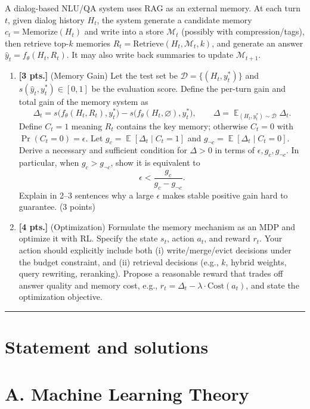 \documentclass[11pt,a4paper]{article}
\DeclareMathOperator{\E}{\mathbb{E}}
\newcommand{\examstatement}[1]{%
  \par\addvspace{0.85em}%
  \noindent{\bfseries #1}\par\nobreak\addvspace{0.28em}%
}
\begin{document}
\examstatement{Problem 5. [7 pts.]}
A dialog-based NLU/QA system uses RAG as an external memory. At each turn $t$, given dialog history $H_t$, the system generate a candidate memory $c_t = \mathrm{Memorize}(H_t)$ and write into a store $\mathcal{M}_t$ (possibly with compression/tags), then retrieve top-$k$ memories $R_t = \mathrm{Retrieve}(H_t, \mathcal{M}_t, k)$, and generate an answer $\hat{y}_t = f_{\theta}(H_t, R_t)$. It may also write back summaries to update $\mathcal{M}_{t+1}$.
\begin{enumerate}[label=(\alph*)]
    \item \textbf{[3 pts.]} (Memory Gain) Let the test set be $\mathcal{D} = \{(H_t, y_t^{*})\}$ and $s(\hat{y}_t, y_t^{*}) \in [0, 1]$ be the evaluation score. Define the per-turn gain and total gain of the memory system as
    \[
    \Delta_t = s\bigl(f_{\theta}(H_t, R_t), y_t^{*}\bigr) - s\bigl(f_{\theta}(H_t, \varnothing), y_t^{*}\bigr), \qquad \Delta = \E_{(H_t, y_t^{*}) \sim \mathcal{D}} \Delta_t.
    \]
    Define $C_t = 1$ meaning $R_t$ contains the key memory; otherwise $C_t = 0$ with $\Pr(C_t = 0) = \epsilon$. Let $g_c = \E[\Delta_t \mid C_t = 1]$ and $g_{\neg c} = \E[\Delta_t \mid C_t = 0]$. Derive a necessary and sufficient condition for $\Delta > 0$ in terms of $\epsilon, g_c, g_{\neg c}$. In particular, when $g_c > g_{\neg c}$, show it is equivalent to
    \[
    \epsilon < \frac{g_c}{g_c - g_{\neg c}}.
    \]
    Explain in 2--3 sentences why a large $\epsilon$ makes stable positive gain hard to guarantee. (3 points)
    \item \textbf{[4 pts.]} (Optimization) Formulate the memory mechanism as an MDP and optimize it with RL. Specify the state $s_t$, action $a_t$, and reward $r_t$. Your action should explicitly include both (i) write/merge/evict decisions under the budget constraint, and (ii) retrieval decisions (e.g., $k$, hybrid weights, query rewriting, reranking). Propose a reasonable reward that trades off answer quality and memory cost, e.g., $r_t = \Delta_t - \lambda \cdot \mathrm{Cost}(a_t)$, and state the optimization objective.
\end{enumerate}


\noindent\rule{\linewidth}{0.4pt}

\section{Statement and solutions}

\section{A. Machine Learning Theory}
\end{document}
